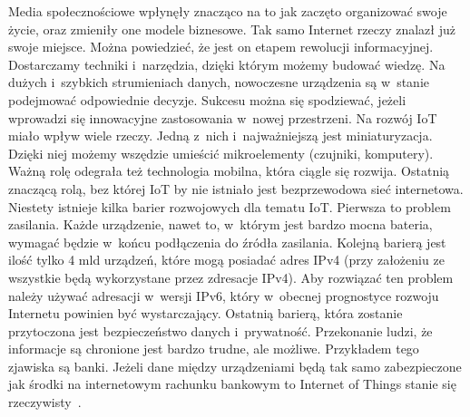 \documentclass{xmgr}
\begin{document}
	Media społecznościowe wpłynęły znacząco na to jak zaczęto organizować swoje życie, oraz zmieniły one modele biznesowe. Tak samo Internet rzeczy znalazł już swoje miejsce. Można powiedzieć, że jest on etapem rewolucji informacyjnej. Dostarczamy techniki i~narzędzia, dzięki którym możemy budować wiedzę. Na dużych i~szybkich strumieniach danych, nowoczesne urządzenia są w~stanie podejmować odpowiednie decyzje. Sukcesu można się spodziewać, jeżeli wprowadzi się innowacyjne zastosowania w~nowej przestrzeni. 
	Na rozwój IoT miało wpływ wiele rzeczy. Jedną z~nich i~najważniejszą jest miniaturyzacja. Dzięki niej możemy wszędzie umieścić mikroelementy (czujniki, komputery). Ważną rolę odegrała też technologia mobilna, która ciągle się rozwija. Ostatnią znaczącą rolą, bez której IoT by nie istniało jest bezprzewodowa sieć internetowa. 
	Niestety istnieje kilka barier rozwojowych dla tematu IoT. Pierwsza to problem zasilania. Każde urządzenie, nawet to, w~którym jest bardzo mocna bateria, wymagać będzie w~końcu podłączenia do źródła zasilania. Kolejną barierą jest ilość tylko 4 mld urządzeń, które mogą posiadać adres IPv4 (przy założeniu ze wszystkie będą wykorzystane przez zdresacje IPv4). Aby rozwiązać ten problem należy używać adresacji w~wersji IPv6, który w~obecnej prognostyce rozwoju Internetu powinien być wystarczający. Ostatnią barierą, która zostanie przytoczona jest bezpieczeństwo danych i~prywatność. Przekonanie ludzi, że informacje są chronione jest bardzo trudne, ale możliwe. Przykładem tego zjawiska są banki. Jeżeli dane między urządzeniami będą tak samo zabezpieczone jak środki na internetowym rachunku bankowym to Internet of Things stanie się rzeczywisty~\cite{KeyApplications}.
\end{document}
